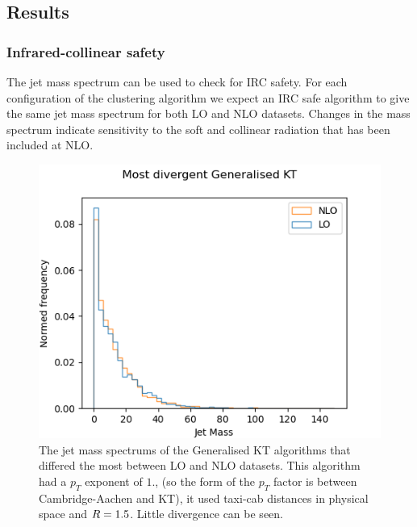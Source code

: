\subsection{Results}

\subsubsection{Infrared-collinear safety}
The jet mass spectrum can be used to check for IRC safety.
For each configuration of the clustering algorithm we expect an IRC safe algorithm to give the 
same jet mass spectrum for both LO and NLO datasets.
Changes in the mass spectrum indicate sensitivity to the soft and collinear radiation that
has been included at NLO.


\begin{figure}[htp]
    \begin{minipage}[c]{0.47\textwidth}
        \includegraphics[width=\textwidth]{graphics/worst_antikt_histOnly.png}
        \caption{The jet mass spectrums of the Generalised KT algorithms that
                 differed the most between LO and NLO datasets.
                 This algorithm had a \(p_T\) exponent of \(1.\),
                 (so the form of the \(p_T\) factor is between Cambridge-Aachen and KT),
                 it used taxi-cab distances in physical space
                 and \(R{} = 1.5\).
                 Little divergence can be seen.
        }
    \end{minipage}\hfill
    \begin{minipage}[c]{0.45\textwidth}

\end{minipage}
\end{figure}
